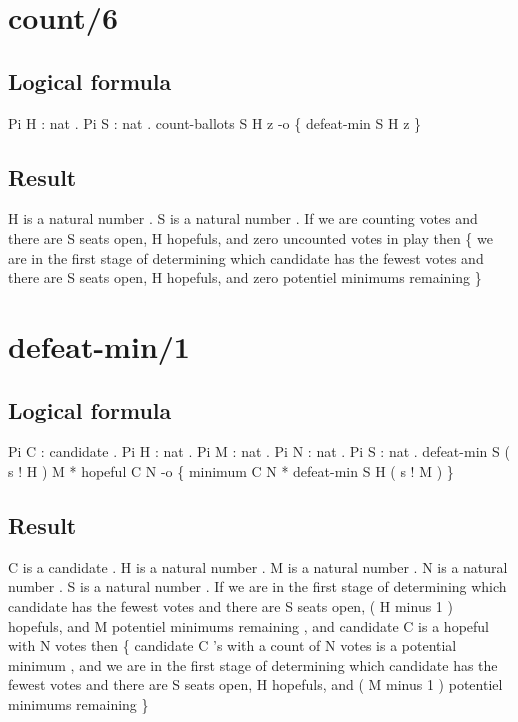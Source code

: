 \section{count/6}
\subsection{Logical formula}
\begin{texto2}
	Pi H : nat . Pi S : nat . count-ballots S H z -o \{ defeat-min S H z \}
\end{texto2}

\subsection{Result}
\begin{texto2}
	H is a natural number . S is a natural number . If we are counting votes and there are S seats open, H hopefuls, and zero uncounted votes in play then \{ we are in the first stage of determining which candidate has the fewest votes and there are S seats open, H hopefuls, and zero potentiel minimums remaining \}
\end{texto2}

\section{defeat-min/1}
\subsection{Logical formula}
\begin{texto2}
	Pi C : candidate . Pi H : nat . Pi M : nat . Pi N : nat . Pi S : nat . defeat-min S ( s ! H ) M * hopeful C N -o \{ minimum C N * defeat-min S H ( s ! M ) \}
\end{texto2}

\subsection{Result}
\begin{texto2}
	C is a candidate . H is a natural number . M is a natural number . N is a natural number . S is a natural number . If we are in the first stage of determining which candidate has the fewest votes and there are S seats open, ( H minus 1 ) hopefuls, and M potentiel minimums remaining , and candidate C is a hopeful with N votes then \{ candidate C 's with a count of N votes is a potential minimum , and we are in the first stage of determining which candidate has the fewest votes and there are S seats open, H hopefuls, and ( M minus 1 ) potentiel minimums remaining \}
\end{texto2}

